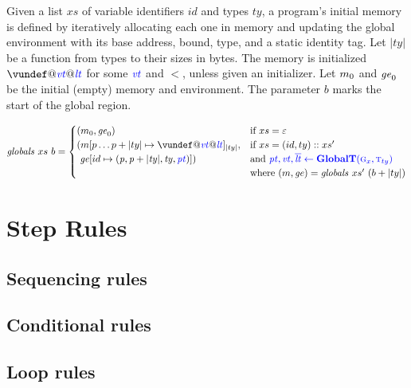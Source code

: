 \documentclass{llncs}
\begin{document}
Given a list \(xs\) of variable identifiers \(id\) and types
\(ty\), a program's initial memory is defined by iteratively allocating each one
in memory and updating the global environment with its base address, bound, type,
and a static identity tag. Let \(|ty|\) be a function from types to their sizes
in bytes. The memory is initialized \(\vundef@\vt@\lt\)
for some \(\mathit{\color{blue} vt}\) and \(\lt\), unless given an initializer.
Let \(m_0\) and \(\mathit{ge}_0\) be the initial (empty) memory and environment.
The parameter \(b\) marks the start of the global region.


\[\mathit{globals} ~ xs ~ b =
\begin{cases}
  (\mem_0, \genv_0) & \textnormal{if } xs = \varepsilon \\
  (\mem[p \dots p+|ty| \mapsto \vundef@\vt@\lt]_{|ty|}, & \textnormal{if } xs = (id,ty)::xs' \\
  ~ \genv[id \mapsto (\mathit{p, p+|ty|,ty,\pt})]) & \textnormal{and } \trule{\globaltres}{\globalt} \\
  & \textnormal{where } (\mem,\genv) = \mathit{globals} ~ xs' ~ (b + |ty|) \\
\end{cases}\]

\section{Step Rules}
\label{app:rules}

\subsection{Sequencing rules}

\sequencing

\subsection{Conditional rules}

\conditionals

\subsection{Loop rules}

\loops
\end{document}
